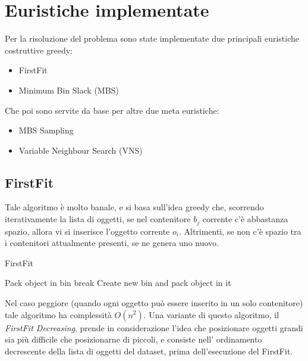 \documentclass{article}
\begin{document}
\section{Euristiche implementate}
Per la risoluzione del problema sono state implementate due principali euristiche costruttive greedy:

\begin{itemize}
\item FirstFit
\item Minimum Bin Slack (MBS)
\end{itemize}

Che poi sono servite da base per altre due meta euristiche:

\begin{itemize}
\item MBS Sampling
\item Variable Neighbour Search (VNS)
\end{itemize} 
\newpage
\subsection{FirstFit}
Tale algoritmo è molto banale, e si basa sull'idea greedy che, scorrendo iterativamente la lista di oggetti, se nel contenitore $b_j$ corrente c'è abbastanza spazio, allora vi si inserisce l'oggetto corrente $o_i$. Altrimenti, se non c'è spazio tra i contenitori attualmente presenti, se ne genera uno nuovo.
\newline
\begin{algorithm}[h]
\caption{FirstFit}\label{FirstFit}
\begin{algorithmic}[1]
\State Pack object in bin
\State break
\EndIf
{}
\EndFor
{}
\State Create new bin and pack object in it
\EndIf 
{}
\EndFor
{}
\end{algorithmic}
\end{algorithm}
\newline
\newline
\newline
Nel caso peggiore (quando ogni oggetto può essere inserito in un solo contenitore) tale algoritmo ha complessità $O(n^2)$.
\newline
\newline
Una variante di questo algoritmo, il \textit{FirstFit Decreasing}, prende in considerazione l'idea che posizionare oggetti grandi sia più difficile che posizionarne di piccoli, e consiste nell' ordinamento decrescente della lista di oggetti del dataset, prima dell'esecuzione del FirstFit. 
\newline
\newline
\end{document}
